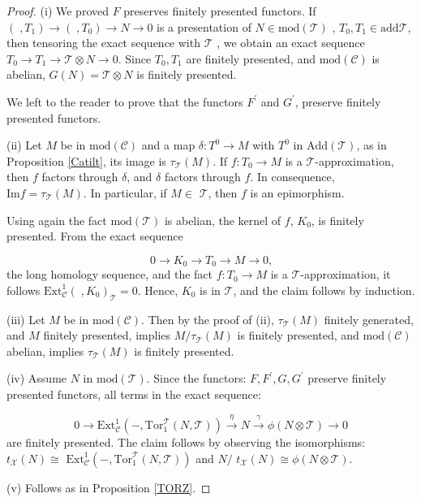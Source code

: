\documentclass{amsart}
\theoremstyle{plain}
\numberwithin{equation}{section}
\begin{document}
\begin{proof}
(i) We proved $F$ preserves finitely presented functors. If $(\;,T_{1})\rightarrow (\;,T_{0})\rightarrow N\rightarrow 0$ is a
presentation of $N\in \mathrm{mod}(\mathcal{T})$ , $T_{0},T_{1}\in \mathrm{add}\mathcal{T}$, then tensoring the exact sequence with $\mathcal{T}$ , we
obtain an exact sequence $T_{0}\rightarrow T_{1}\rightarrow \mathcal{T}\otimes N\rightarrow 0.$ Since $T_{0},T_{1}$ are finitely presented, and $\mathrm{mod}(\mathcal{C})$ is abelian, $G(N)=\mathcal{T}\otimes N$ is
finitely presented.

We left to the reader to prove that the functors $F^{\prime }$ and $G^{\prime}$, preserve finitely presented functors.

(ii) Let $M$ be in $\mathrm{mod}(\mathcal{C})$ and a map $\delta
:T^{0}\rightarrow M$ with $T^{0}$ in $\mathrm{Add}(\mathcal{T})$, as in
Proposition \ref{Catilt}, its image is $\tau _{\mathcal{T}}(M)$. If $f:T_{0}\rightarrow M$ is a $\mathcal{T}$-approximation, then $f$ factors
through $\delta $, and $\delta $ factors through $f$. In consequence, $\mathrm{Im}f=\tau _{\mathcal{T}}(M).$ In particular, if $M\in $ $\mathscr T$, then $f$ is an epimorphism.

Using again the fact $\mathrm{mod}(\mathcal{T})$ is abelian, the kernel of $f $, $K_{0}$, is finitely presented. From the exact sequence

\begin{equation*}
0\rightarrow K_{0}\rightarrow T_{0}\rightarrow M\rightarrow 0\text{,}
\end{equation*}
the long homology sequence, and the fact $f:T_{0}\rightarrow M$ is a $\mathcal{T}$-approximation, it follows $\mathrm{Ext}_\mathcal{C}^{1}(\;,K_{0})_{\mathcal{T}}=0$. Hence, $K_{0}$ is in $\mathscr T$, and the
claim follows by induction.

(iii) Let $M$ be in $\mathrm{mod}(\mathcal{C}).$ Then by the proof of (ii), $\tau_{\mathcal{T}}(M)$ finitely generated, and $M$ finitely presented,
implies $M/\tau _{\mathcal{T}}(M)$ is finitely presented, and $\mathrm{mod}(\mathcal{C})$ abelian, implies $\tau _{\mathcal{T}}(M)$ is finitely
presented.

(iv) Assume $N$ in $\mathrm{mod}(\mathcal{T})$. Since the functors: $F,F^{\prime} ,G,G^{\prime}$ preserve finitely presented functors, all terms
in the exact sequence:

\begin{equation*}
0\rightarrow \mathrm{Ext}_{\mathcal{C}}^{1}(-,\mathrm{Tor}_{1}^{\mathcal{T}}(N,\mathcal{T}))\xrightarrow{\eta}N\xrightarrow {\gamma}\phi (N\otimes
\mathcal{T})\rightarrow 0
\end{equation*}are finitely presented. The claim follows by observing the isomorphisms: $t_{\mathscr{X}}(N)\cong $ $\mathrm{Ext}_{\mathcal{C}}^{1}(-,\mathrm{Tor}_{1}^{\mathcal{T}}(N,\mathcal{T}))$ and $N/$ $t_{\mathscr{X}}(N)\cong \phi
(N\otimes \mathcal{T})$.

(v) Follows as in Proposition \ref{TORZ}.
\end{proof}
\end{document}
